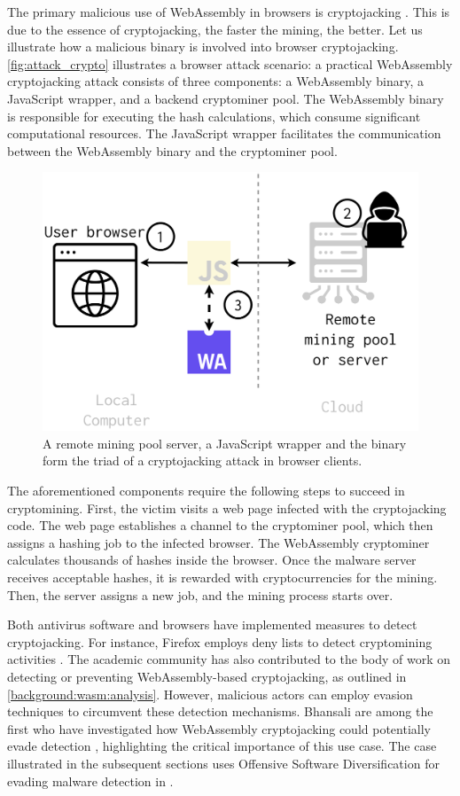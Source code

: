 \label{offensive_app}

The primary malicious use of WebAssembly in browsers is cryptojacking \cite{musch2019new}. 
This is due to the essence of cryptojacking, the faster the mining, the better. 
Let us illustrate how a malicious \Wasm binary is involved into browser cryptojacking.
\autoref{fig:attack_crypto} illustrates a browser attack scenario:
a practical WebAssembly cryptojacking attack consists of three components: a WebAssembly binary, a JavaScript wrapper, and a backend cryptominer pool. 
The WebAssembly binary is responsible for executing the hash calculations, which consume significant computational resources. 
The JavaScript wrapper facilitates the communication between the WebAssembly binary and the cryptominer pool.

\begin{figure}[h]
    \centering
    \includegraphics[width=0.6\linewidth]{figures/attack_crypto.pdf}
    \caption{A remote mining pool server, a JavaScript wrapper and the \Wasm binary form the triad of a cryptojacking attack in browser clients.}
    \label{fig:attack_crypto}
\end{figure}

The aforementioned components require the following steps to succeed in cryptomining.
First, the victim visits a web page infected with the cryptojacking code. 
The web page establishes a channel to the cryptominer pool, which then assigns a hashing job to the infected browser. 
The WebAssembly cryptominer calculates thousands of hashes inside the browser. 
Once the malware server receives acceptable hashes, it is rewarded with cryptocurrencies for the mining. 
Then, the server assigns a new job, and the mining process starts over.

Both antivirus software and browsers have implemented measures to detect cryptojacking. For instance, Firefox employs deny lists to detect cryptomining activities \cite{firefoxcrypto}. 
The academic community has also contributed to the body of work on detecting or preventing WebAssembly-based cryptojacking, as outlined in \autoref{background:wasm:analysis}. 
However, malicious actors can employ evasion techniques to circumvent these detection mechanisms. 
Bhansali \etal are among the first who have investigated how WebAssembly cryptojacking could potentially evade detection \cite{10.1145/3507657.3528560}, highlighting the critical importance of this use case. 
The case illustrated in the subsequent sections uses Offensive Software Diversification for evading malware detection in \Wasm. 

